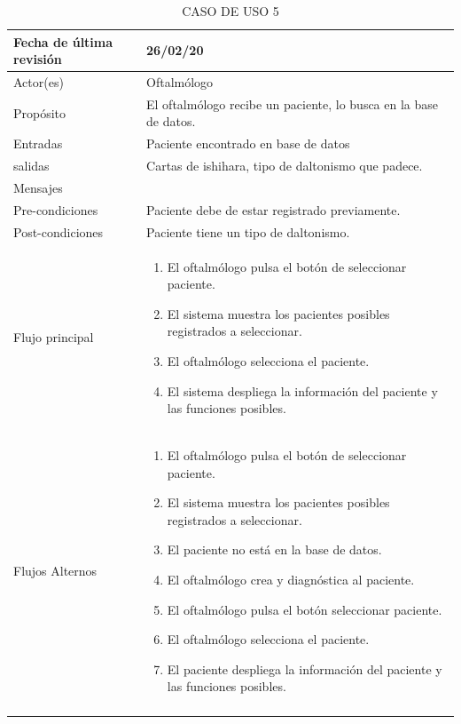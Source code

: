 \documentclass[10pt]{article}
\begin{document}
\begin{longtable}{|p{3.8cm}|p{10.8cm}|}
\hline
Fecha de última revisión & 26/02/20\\
\hline
Actor(es) & Oftalmólogo \\
\hline
Propósito & El oftalmólogo recibe un paciente, lo busca en la base de datos. \\
\hline
Entradas & Paciente encontrado en base de datos\\
\hline
salidas & Cartas de ishihara, tipo de daltonismo que padece. \\
\hline
Mensajes & \\
\hline
Pre-condiciones & Paciente debe de estar registrado previamente.\\
\hline
Post-condiciones & Paciente tiene un tipo de daltonismo.\\
\hline
Flujo principal & \begin{enumerate}
    \item El oftalmólogo pulsa el botón de seleccionar paciente.
    \item El sistema muestra los pacientes posibles registrados a seleccionar.
    \item El oftalmólogo selecciona el paciente.
    \item El sistema despliega la información del paciente y las funciones posibles.
\end{enumerate}
    \\
\hline
Flujos Alternos &  \begin{enumerate}
    \item El oftalmólogo pulsa el botón de seleccionar paciente.
    \item El sistema muestra los pacientes posibles registrados a seleccionar.
    \item El paciente no está en la base de datos. 
    \item El oftalmólogo crea y diagnóstica al paciente.
    \item El oftalmólogo pulsa el botón seleccionar paciente.
    \item El oftalmólogo selecciona el paciente.
    \item El paciente despliega la información del paciente y las funciones posibles.
\end{enumerate}\\
\hline
\caption{CASO DE USO 5}
\label{tabla1}
\end{longtable}

\newpage
\end{document}

